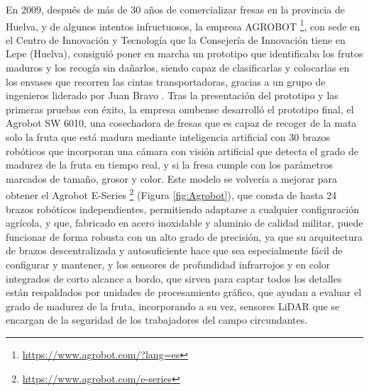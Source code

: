 \pagebreak
En 2009, después de más de 30 años de comercializar fresas en la provincia de Huelva, y de algunos intentos infructuosos, la empresa AGROBOT \footnote{\url{https://www.agrobot.com/?lang=es}}, con sede en el Centro de Innovación y Tecnología que la Consejería de Innovación tiene en Lepe (Huelva), consiguió poner en marcha un prototipo %
que identificaba los frutos maduros y los recogía sin dañarlos, siendo capaz de clasificarlas y colocarlas en los envases que recorren las cintas transportadoras, gracias a un grupo de ingenieros liderado por Juan Bravo \cite{Cabanillas09}. Tras la presentación del prototipo y las primeras pruebas con éxito, la empresa onubense desarrolló el prototipo final, el Agrobot SW 6010, una cosechadora de fresas que es capaz de recoger de la mata solo la fruta que está madura mediante inteligencia artificial con 30 brazos robóticos que incorporan una cámara con visión artificial que detecta el grado de madurez de la fruta %
en tiempo real, y si la fresa cumple con los parámetros marcados de tamaño, grosor y color. %
Este modelo se volvería a mejorar para obtener el Agrobot E-Series \footnote{\url{https://www.agrobot.com/e-series}} (Figura \ref{fig:Agrobot}), que consta de hasta 24 brazos robóticos independientes, permitiendo adaptarse a cualquier configuración agrícola, y que, fabricado en acero inoxidable y aluminio de calidad militar, puede funcionar de forma robusta con un alto grado de precisión, ya que su arquitectura de brazos descentralizada y autosuficiente hace que sea especialmente fácil de configurar y mantener, y los sensores de profundidad infrarrojos y en color integrados de corto alcance a bordo, que sirven para captar todos los detalles están respaldados por unidades de procesamiento gráfico, que ayudan a evaluar el grado de madurez de la fruta, incorporando a su vez, sensores LiDAR que se encargan de la seguridad de los trabajadores del campo circundantes.

